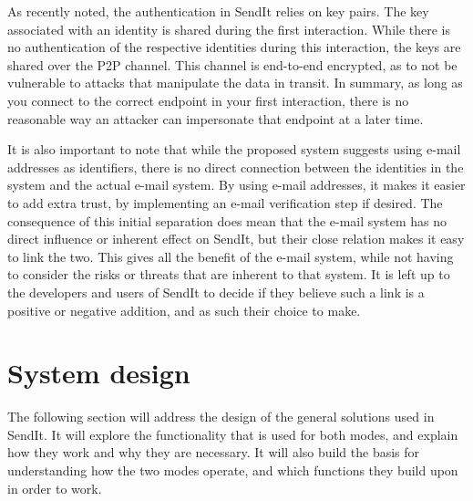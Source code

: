		As recently noted, the authentication in SendIt relies on key pairs. The key associated with an identity is shared during the first interaction. While there is no authentication of the respective identities during this interaction, the keys are shared over the P2P channel. This channel is end-to-end encrypted, as to not be vulnerable to attacks that manipulate the data in transit. In summary, as long as you connect to the correct endpoint in your first interaction, there is no reasonable way an attacker can impersonate that endpoint at a later time.

		It is also important to note that while the proposed system suggests using e-mail addresses as identifiers, there is no direct connection between the identities in the system and the actual e-mail system. By using e-mail addresses, it makes it easier to add extra trust, by implementing an e-mail verification step if desired. The consequence of this initial separation does mean that the e-mail system has no direct influence or inherent effect on SendIt, but their close relation makes it easy to link the two. This gives all the benefit of the e-mail system, while not having to consider the risks or threats that are inherent to that system. It is left up to the developers and users of SendIt to decide if they believe such a link is a positive or negative addition, and as such their choice to make.
%
\section{System design}
%
The following section will address the design of the general solutions used in SendIt. It will explore the functionality that is used for both modes, and explain how they work and why they are necessary. It will also build the basis for understanding how the two modes operate, and which functions they build upon in order to work.

